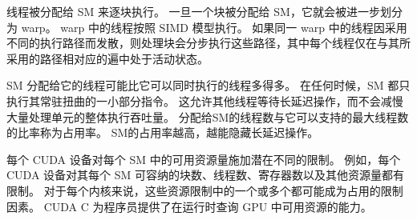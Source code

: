 线程被分配给 SM 来逐块执行。 一旦一个块被分配给 SM，它就会被进一步划分为 warp。 warp 中的线程按照 SIMD 模型执行。 如果同一 warp 中的线程因采用不同的执行路径而发散，则处理块会分步执行这些路径，其中每个线程仅在与其所采用的路径相对应的遍中处于活动状态。

SM 分配给它的线程可能比它可以同时执行的线程多得多。 在任何时候，SM 都只执行其常驻扭曲的一小部分指令。 这允许其他线程等待长延迟操作，而不会减慢大量处理单元的整体执行吞吐量。 分配给SM的线程数与它可以支持的最大线程数的比率称为占用率。 SM的占用率越高，越能隐藏长延迟操作。

每个 CUDA 设备对每个 SM 中的可用资源量施加潜在不同的限制。 例如，每个 CUDA 设备对其每个 SM 可容纳的块数、线程数、寄存器数以及其他资源量都有限制。 对于每个内核来说，这些资源限制中的一个或多个都可能成为占用的限制因素。 CUDA C 为程序员提供了在运行时查询 GPU 中可用资源的能力。






